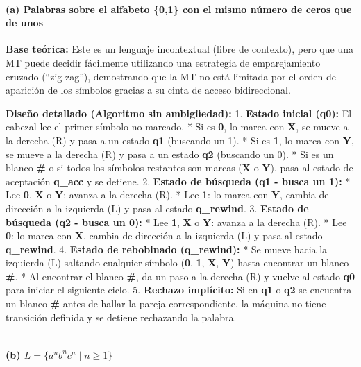 \documentclass[12pt]{book} %
\begin{document}
\hypertarget{a-palabras-sobre-el-alfabeto-01-con-el-mismo-nuxfamero-de-ceros-que-de-unos}{%
\paragraph{(a) Palabras sobre el alfabeto \{0,1\} con el mismo número de
ceros que de
unos}\label{a-palabras-sobre-el-alfabeto-01-con-el-mismo-nuxfamero-de-ceros-que-de-unos}}

\textbf{Base teórica:} Este es un lenguaje incontextual (libre de
contexto), pero que una MT puede decidir fácilmente utilizando una
estrategia de emparejamiento cruzado (``zig-zag''), demostrando que la
MT no está limitada por el orden de aparición de los símbolos gracias a
su cinta de acceso bidireccional.

\textbf{Diseño detallado (Algoritmo sin ambigüedad):} 1. \textbf{Estado
inicial (q0):} El cabezal lee el primer símbolo no marcado. * Si es
\textbf{0}, lo marca con \textbf{X}, se mueve a la derecha (R) y pasa a
un estado \textbf{q1} (buscando un 1). * Si es \textbf{1}, lo marca con
\textbf{Y}, se mueve a la derecha (R) y pasa a un estado \textbf{q2}
(buscando un 0). * Si es un blanco \textbf{\#} o si todos los símbolos
restantes son marcas (\textbf{X} o \textbf{Y}), pasa al estado de
aceptación \textbf{q\_acc} y se detiene. 2. \textbf{Estado de búsqueda
(q1 - busca un 1):} * Lee \textbf{0}, \textbf{X} o \textbf{Y}: avanza a
la derecha (R). * Lee \textbf{1}: lo marca con \textbf{Y}, cambia de
dirección a la izquierda (L) y pasa al estado \textbf{q\_rewind}. 3.
\textbf{Estado de búsqueda (q2 - busca un 0):} * Lee \textbf{1},
\textbf{X} o \textbf{Y}: avanza a la derecha (R). * Lee \textbf{0}: lo
marca con \textbf{X}, cambia de dirección a la izquierda (L) y pasa al
estado \textbf{q\_rewind}. 4. \textbf{Estado de rebobinado (q\_rewind):}
* Se mueve hacia la izquierda (L) saltando cualquier símbolo
(\textbf{0}, \textbf{1}, \textbf{X}, \textbf{Y}) hasta encontrar un
blanco \textbf{\#}. * Al encontrar el blanco \textbf{\#}, da un paso a
la derecha (R) y vuelve al estado \textbf{q0} para iniciar el siguiente
ciclo. 5. \textbf{Rechazo implícito:} Si en \textbf{q1} o \textbf{q2} se
encuentra un blanco \textbf{\#} antes de hallar la pareja
correspondiente, la máquina no tiene transición definida y se detiene
rechazando la palabra.

\begin{center}\rule{0.5\linewidth}{0.5pt}\end{center}

\hypertarget{b-l-an-bn-cn-mid-n-ge-1}{%
\paragraph{\texorpdfstring{(b)
\(L = \{a^n b^n c^n \mid n \ge 1\}\)}{(b) L = \textbackslash\{a\^{}n b\^{}n c\^{}n \textbackslash mid n \textbackslash ge 1\textbackslash\}}}\label{b-l-an-bn-cn-mid-n-ge-1}}
\end{document}
